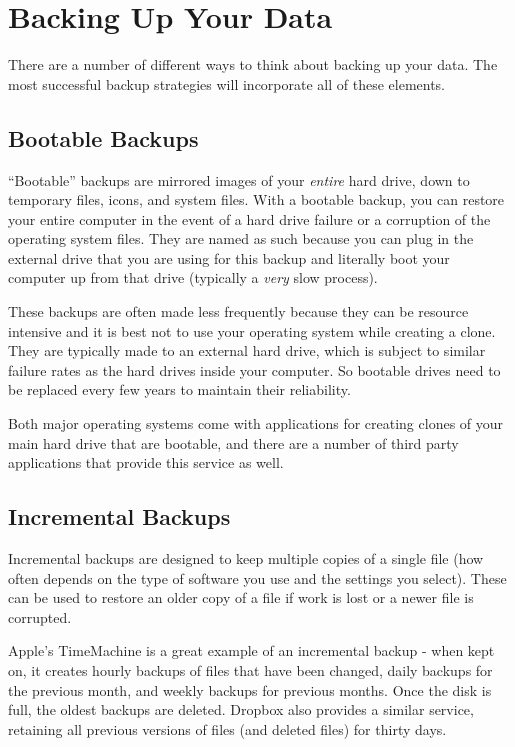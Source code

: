 \documentclass[]{book}
\begin{document}
\section{Backing Up Your Data}\label{backing-up-your-data}

There are a number of different ways to think about backing up your
data. The most successful backup strategies will incorporate all of
these elements.

\subsection{Bootable Backups}\label{bootable-backups}

``Bootable'' backups are mirrored images of your \emph{entire} hard
drive, down to temporary files, icons, and system files. With a bootable
backup, you can restore your entire computer in the event of a hard
drive failure or a corruption of the operating system files. They are
named as such because you can plug in the external drive that you are
using for this backup and literally boot your computer up from that
drive (typically a \emph{very} slow process).

These backups are often made less frequently because they can be
resource intensive and it is best not to use your operating system while
creating a clone. They are typically made to an external hard drive,
which is subject to similar failure rates as the hard drives inside your
computer. So bootable drives need to be replaced every few years to
maintain their reliability.

Both major operating systems come with applications for creating clones
of your main hard drive that are bootable, and there are a number of
third party applications that provide this service as well.

\subsection{Incremental Backups}\label{incremental-backups}

Incremental backups are designed to keep multiple copies of a single
file (how often depends on the type of software you use and the settings
you select). These can be used to restore an older copy of a file if
work is lost or a newer file is corrupted.

Apple's TimeMachine is a great example of an incremental backup - when
kept on, it creates hourly backups of files that have been changed,
daily backups for the previous month, and weekly backups for previous
months. Once the disk is full, the oldest backups are deleted. Dropbox
also provides a similar service, retaining all previous versions of
files (and deleted files) for thirty days.
\end{document}
